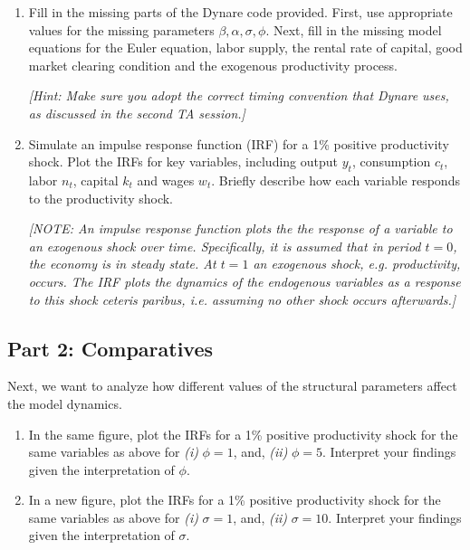 \documentclass[a4paper,11pt]{article}
\begin{document}
\begin{enumerate}
    \item[1.] Fill in the missing parts of the Dynare code provided. First,  use appropriate values for the missing parameters $\beta, \alpha, \sigma, \phi$. Next, fill in the missing model equations for the Euler equation, labor supply, the rental rate of capital, good market clearing condition and the exogenous productivity process.  

    \textit{[Hint: Make sure you adopt the correct timing convention that Dynare uses, as discussed in the second TA session.]}


    \item[2.] Simulate an impulse response function (IRF) for a 1\% positive productivity shock. Plot the IRFs for key variables, including output \( y_t \), consumption \( c_t \), labor \( n_t \), capital \( k_t \) and wages \( w_t   \). Briefly describe how each variable responds to the productivity shock.

    \textit{[NOTE: An impulse response function plots the the response of a variable to an exogenous shock over time. Specifically, it is assumed that in period $t=0$, the economy is in steady state. At $t=1$ an exogenous shock, e.g. productivity, occurs. The IRF plots the dynamics of the endogenous variables as a response to this shock ceteris paribus, i.e. assuming no other shock occurs afterwards.]}


    
\end{enumerate}

\subsection*{Part 2: Comparatives}
Next, we want to analyze how different values of the structural parameters affect the model dynamics. 
\begin{enumerate}
    \item[3.] In the same figure, plot the IRFs for a 1\% positive productivity shock for the same variables as above for \textit{(i)} $\phi = 1$, and, \textit{(ii)} $\phi = 5$. Interpret your findings given the interpretation of $\phi$.

    \item[4.] In a new figure, plot the IRFs for a 1\% positive productivity shock for the same variables as above for \textit{(i)} $\sigma = 1$, and, \textit{(ii)} $\sigma = 10$. Interpret your findings given the interpretation of $\sigma$.

\end{enumerate}
\end{document}
